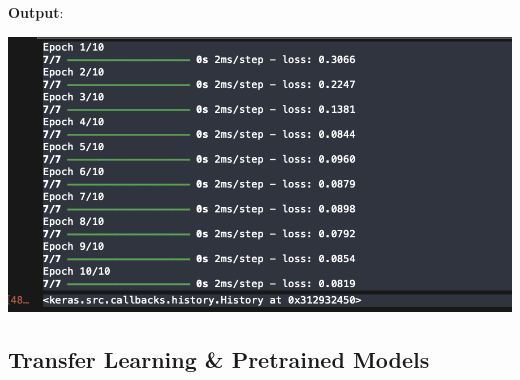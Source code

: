 \documentclass{article}
\begin{document}
\textbf{Output}:

\includegraphics[width=14cm,height=6
cm]{RNN_Output.png}
\subsection{Transfer Learning \& Pretrained Models}
\end{document}
